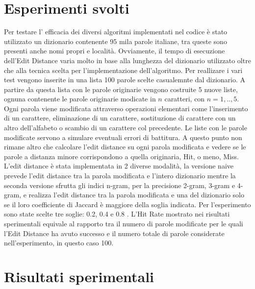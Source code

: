 \documentclass{article}
\begin{document}
\section{Esperimenti svolti}
Per testare l' efficacia dei diversi algoritmi implementati nel codice è stato utilizzato un dizionario contenente 95 mila parole italiane, tra queste sono presenti anche nomi propri e località. Ovviamente, il tempo di esecuzione dell'Edit Distance varia molto in base alla lunghezza del dizionario utilizzato oltre che alla tecnica scelta per l'implementazione dell'algoritmo. Per reallizare i vari test vengono inserite in una lista 100 parole scelte casualemnte dal dizionario. A partire da questa lista con le parole originarie vengono costruite 5 nuove liste, ognuna contenente le parole originarie modicate in $n$ caratteri, con $n =1,..,5$. Ogni parola viene modificata attraverso operazioni elementari come l'inserimento di un carattere, eliminazione di un carattere, sostituzione di carattere con un altro dell'alfabeto o scambio di un carattere col precedente. Le liste con le parole modificate servono a simulare eventuali errori di battitura. A questo punto non rimane altro che calcolare l'edit distance su ogni parola modificata e vedere se le parole a distanza minore corrispondono a quella originaria, Hit, o meno, Miss.
L'edit distance è stata implementata in 2 diverse modalità, la versione naive prevede l'edit distance tra la parola modificata e l'intero dizionario mentre la seconda versione sfrutta gli indici n-gram, per la precisione 2-gram, 3-gram e 4-gram, e realizza l'edit distance tra la parola modificata e una del dizionario solo se il loro coefficiente di Jaccard è maggiore della soglia indicata. Per l'esperimento sono state scelte tre soglie: 0.2, 0.4 e 0.8 .
L'Hit Rate mostrato nei risultati sperimentali equivale al rapporto tra il numero di parole modificate per le quali l'Edit Distance ha avuto successo e il numero totale di parole considerate nell'esperimento, in questo caso 100.

\section{Risultati sperimentali}
\end{document}
